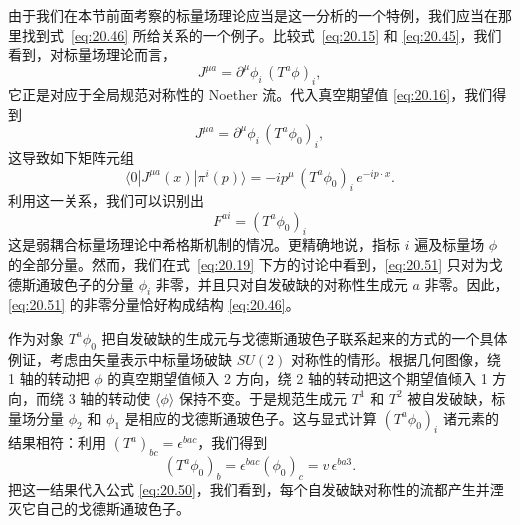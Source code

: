 由于我们在本节前面考察的标量场理论应当是这一分析的一个特例，我们应当在那里找到式~\eqref{eq:20.46} 所给关系的一个例子。比较式~\eqref{eq:20.15} 和 \eqref{eq:20.45}，我们看到，对标量场理论而言，
\begin{equation}
  J^{\mu a} = \partial^\mu\phi_i\,(T^a\phi)_i ,
  \label{eq:20.48}
\end{equation}
它正是对应于全局规范对称性的 Noether 流。代入真空期望值 \eqref{eq:20.16}，我们得到
\begin{equation}
  J^{\mu a} = \partial^\mu\phi_i\,(T^a\phi_0)_i ,
  \label{eq:20.49}
\end{equation}
这导致如下矩阵元组
\begin{equation}
  \langle 0|J^{\mu a}(x)|\pi^i(p)\rangle = -ip^\mu\,(T^a\phi_0)_i\,
    e^{-ip\cdot x} .
  \label{eq:20.50}
\end{equation}
利用这一关系，我们可以识别出
\begin{equation}
  F^{ai} = (T^a\phi_0)_i
  \label{eq:20.51}
\end{equation}
这是弱耦合标量场理论中希格斯机制的情况。更精确地说，指标 $i$ 遍及标量场 $\phi$ 的全部分量。然而，我们在式~\eqref{eq:20.19} 下方的讨论中看到，\eqref{eq:20.51} 只对为戈德斯通玻色子的分量 $\phi_i$ 非零，并且只对自发破缺的对称性生成元 $a$ 非零。因此，\eqref{eq:20.51} 的非零分量恰好构成结构 \eqref{eq:20.46}。

作为对象 $T^a\phi_0$ 把自发破缺的生成元与戈德斯通玻色子联系起来的方式的一个具体例证，考虑由矢量表示中标量场破缺 $SU(2)$ 对称性的情形。根据几何图像，绕 1 轴的转动把 $\phi$ 的真空期望值倾入 2 方向，绕 2 轴的转动把这个期望值倾入 1 方向，而绕 3 轴的转动使 $\langle\phi\rangle$ 保持不变。于是规范生成元 $T^1$ 和 $T^2$ 被自发破缺，标量场分量 $\phi_2$ 和 $\phi_1$ 是相应的戈德斯通玻色子。这与显式计算 $(T^a\phi_0)_i$ 诸元素的结果相符：利用 $(T^a)_{bc} = \epsilon^{bac}$，我们得到
\begin{equation}
  (T^a\phi_0)_b = \epsilon^{bac}(\phi_0)_c = v\,\epsilon^{ba3} .
  \label{eq:20.52}
\end{equation}
把这一结果代入公式 \eqref{eq:20.50}，我们看到，每个自发破缺对称性的流都产生并湮灭它自己的戈德斯通玻色子。

